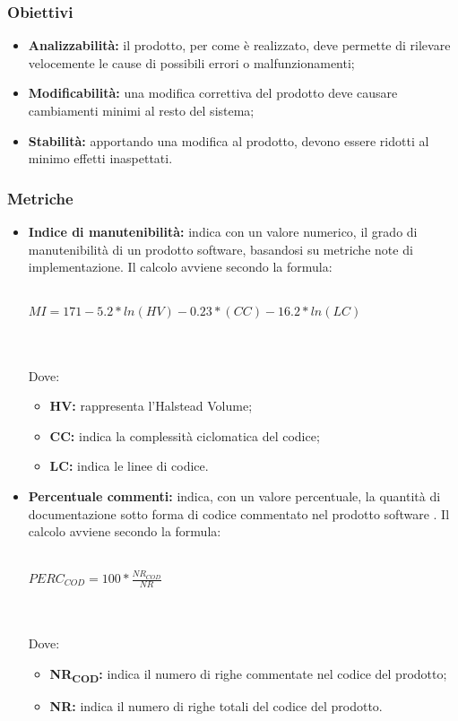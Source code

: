 \subsubsection{Obiettivi}
\begin{itemize}
	\item \textbf{Analizzabilità:} il prodotto, per come è realizzato, deve permette di rilevare velocemente le cause di possibili errori o malfunzionamenti;
	\item \textbf{Modificabilità:} una modifica correttiva del prodotto deve causare cambiamenti minimi al resto del sistema;
	\item \textbf{Stabilità:} apportando una modifica al prodotto, devono essere ridotti al minimo effetti inaspettati.
\end{itemize}
\subsubsection{Metriche}
\begin{itemize}
	\item \textbf{Indice di manutenibilità:} indica con un valore numerico, il grado di manutenibilità di un prodotto software, basandosi su metriche note di implementazione. Il calcolo avviene secondo la formula:\\\\
	\centerline{
		\begin{math}
		MI= 171-5.2*ln(HV)-0.23*(CC)-16.2*ln(LC)
		\end{math}
	}
	\\\\Dove:
	\begin{itemize}
		\item \textbf{HV:} rappresenta l'Halstead Volume;
		\item \textbf{CC:} indica la complessità ciclomatica del codice;
		\item \textbf{LC:} indica le linee di codice.
	\end{itemize}
	\item \textbf{Percentuale commenti:} indica, con un valore percentuale, la quantità di documentazione sotto forma di codice commentato nel prodotto software . Il calcolo avviene secondo la formula:\\\\
	\centerline{
		\begin{math}
		PERC_{COD}=100*\frac{NR_{COD}}{NR}
		\end{math}
	}
	\\\\Dove:
	\begin{itemize}
		\item \textbf{NR\textsubscript{COD}:} indica il numero di righe commentate nel codice del prodotto;
		\item \textbf{NR:} indica il numero di righe totali del codice del prodotto.
	\end{itemize}
\end{itemize}

